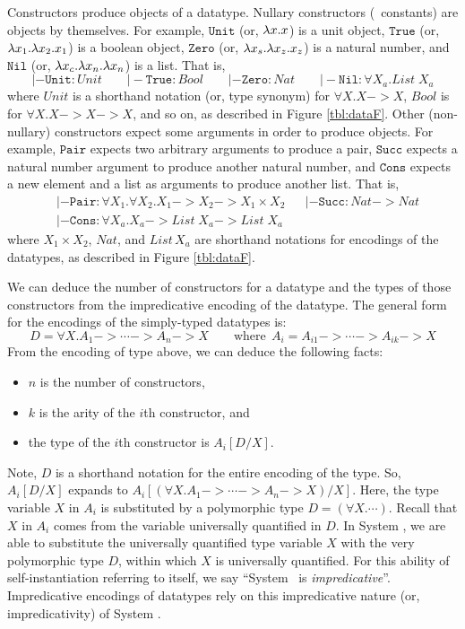 Constructors produce objects of a datatype. Nullary constructors
(\aka\ constants) are objects by themselves. For example,
$\mathtt{Unit}$ (or, $\lambda x.x$) is a unit object,
$\mathtt{True}$ (or, $\lambda x_1.\lambda x_2. x_1$) is a boolean object,
$\mathtt{Zero}$ (or, $\lambda x_s. \lambda x_z. x_z$) is a natural number, and
$\mathtt{Nil}$ (or, $\lambda x_c.\lambda x_n.\lambda x_n$) is a list.
That is,
\[
|- \mathtt{Unit}:\textit{Unit} \qquad
|- \mathtt{True}:\textit{Bool} \qquad
|- \mathtt{Zero}:\textit{Nat} \qquad
|- \mathtt{Nil}:\forall X_a.\textit{List}\;X_a
\]
where $\textit{Unit}$ is a shorthand notation (or, type synonym)
for $\forall X.X -> X$, $Bool$ is for $\forall X.X -> X -> X$, and so on,
as described in Figure \ref{tbl:dataF}.
Other (non-nullary) constructors expect some arguments in order to produce
objects. For example, $\mathtt{Pair}$ expects two arbitrary arguments
to produce a pair, $\mathtt{Succ}$ expects a natural number argument
to produce another natural number, and $\mathtt{Cons}$ expects
a new element and a list as arguments to produce another list. That is,
\begin{align*}
& |- \mathtt{Pair} : \forall X_1. \forall X_2. X_1 -> X_2 -> X_1\times X_2
&& |- \mathtt{Succ} : \textit{Nat} -> \textit{Nat} \\ &
|- \mathtt{Cons} : \forall X_a. X_a -> \mathit{List}\;X_a -> \mathit{List}\;X_a
\end{align*}
where ${X_1 \times X_2}$, $\mathit{Nat}$, and $\mathit{List\,X_a}$
are shorthand notations for encodings of the datatypes,
as described in Figure \ref{tbl:dataF}.

We can deduce the number of constructors for a datatype and the types
of those constructors from the impredicative encoding of the datatype.
The general form for the encodings of the simply-typed datatypes is:
\[D = \forall X. A_1 -> \cdots -> A_n -> X
        \qquad\text{where}~~ A_i = A_{i1} -> \cdots -> A_{ik} -> X \]
From the encoding of type above, we can deduce the following facts:
\begin{itemize}
\item $n$ is the number of constructors,
\item $k$ is the arity of the $i$th constructor, and
\item the type of the $i$th constructor is $A_i[D/X]$.
\end{itemize}
Note, $D$ is a shorthand notation for the entire encoding of the type.
So, $A_i[D/X]$ expands to $A_i[(\forall X. A_1 -> \cdots -> A_n -> X)/ X]$.
Here, the type variable $X$ in $A_i$ is substituted by a polymorphic type
$D = (\forall X. \cdots)$. Recall that $X$ in $A_i$ comes from
the variable universally quantified in $D$. In System \F, we are able to
substitute the universally quantified type variable $X$ with
the very polymorphic type $D$, within which $X$ is universally quantified.
For this ability of self-instantiation referring to itself, we say
``System \F\ is \emph{impredicative}''. Impredicative encodings
of datatypes rely on this impredicative nature (or, impredicativity)
of System \F.

